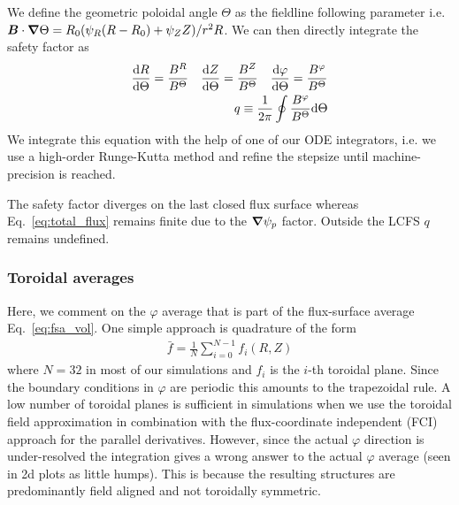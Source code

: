 We define the geometric poloidal angle $\Theta$ as the fieldline following
parameter i.e. ${\boldsymbol{B}}\cdot{\boldsymbol{\nabla}}\Theta = R_0(\psi_R (R-R_0) + \psi_Z Z)/r^2R$.
We can then directly integrate the safety factor as
\begin{align}\label{eq:safety_factor}
\frac{\mathrm{d} R}{\mathrm{d}\Theta} = \frac{B^R}{B^\Theta}\quad
\frac{\mathrm{d} Z}{\mathrm{d}\Theta} = \frac{B^Z}{B^\Theta}\quad
\frac{\mathrm{d} \varphi}{\mathrm{d}\Theta} = \frac{B^\varphi}{B^\Theta}\\
q\equiv\frac{1}{2\pi}\oint \frac{B^\varphi}{B^\Theta} \mathrm{d}\Theta
\end{align}
We integrate this equation with the help of one of our ODE integrators, i.e. we use a high-order Runge-Kutta method
and refine the stepsize until machine-precision is reached.
\begin{tcolorbox}[title=Note]
The safety factor diverges on the last closed flux
surface whereas Eq.~\eqref{eq:total_flux}
remains finite due to the ${\boldsymbol{\nabla}}\psi_p$ factor. Outside the LCFS $q$ remains undefined.
\end{tcolorbox}
\subsubsection{Toroidal averages}
Here, we comment on the $\varphi$ average that is part of the flux-surface average Eq.~\eqref{eq:fsa_vol}.
One simple approach is
quadrature of the form
\begin{align}\label{eq:toroidal_summation}
    \bar f = \frac{1}{N} \sum_{i=0}^{N-1} f_i (R,Z)
\end{align}
where $N=32$ in most of our simulations and $f_i$ is the $i$-th toroidal plane.
Since the boundary conditions in $\varphi$ are periodic this amounts to the trapezoidal rule.
A low number of toroidal planes is sufficient in simulations when we use the toroidal field
approximation in combination with the
flux-coordinate independent (FCI) approach for the parallel derivatives.
However, since the actual $\varphi$ direction is
under-resolved the
integration gives a wrong answer to the actual $\varphi$ average (seen in 2d plots as little humps).
This is because the resulting structures are predominantly field aligned and not toroidally symmetric.

